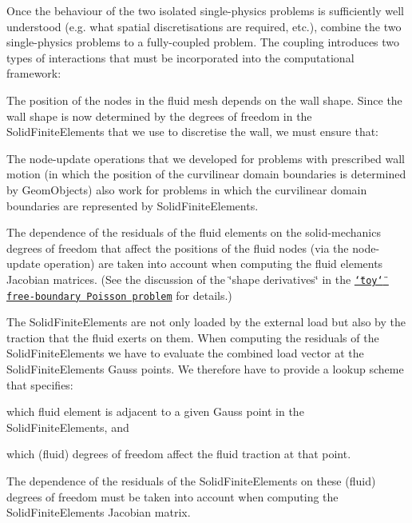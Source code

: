 Once the behaviour of the two isolated single-\/physics problems is sufficiently well understood (e.\+g. what spatial discretisations are required, etc.), combine the two single-\/physics problems to a fully-\/coupled problem. The coupling introduces two types of interactions that must be incorporated into the computational framework\+:
\begin{DoxyEnumerate}
\item The position of the nodes in the fluid mesh depends on the wall shape. Since the wall shape is now determined by the degrees of freedom in the {\ttfamily Solid\+Finite\+Elements} that we use to discretise the wall, we must ensure that\+:
\begin{DoxyEnumerate}
\item The node-\/update operations that we developed for problems with prescribed wall motion (in which the position of the curvilinear domain boundaries is determined by {\ttfamily Geom\+Objects}) also work for problems in which the curvilinear domain boundaries are represented by {\ttfamily Solid\+Finite\+Elements}.
\item The dependence of the residuals of the fluid elements on the solid-\/mechanics degrees of freedom that affect the positions of the fluid nodes (via the node-\/update operation) are taken into account when computing the fluid elements\textquotesingle{} Jacobian matrices. (See the discussion of the \char`\"{}shape derivatives\char`\"{} in the \href{../../macro_element_free_boundary_poisson/html/index.html}{\tt \char`\"{}toy\char`\"{} free-\/boundary Poisson problem} for details.)
\end{DoxyEnumerate}
\item The {\ttfamily Solid\+Finite\+Elements} are not only loaded by the external load but also by the traction that the fluid exerts on them. When computing the residuals of the {\ttfamily Solid\+Finite\+Elements} we have to evaluate the combined load vector at the {\ttfamily Solid\+Finite\+Element\textquotesingle{}s} Gauss points. We therefore have to provide a lookup scheme that specifies\+:
\begin{DoxyEnumerate}
\item which fluid element is adjacent to a given Gauss point in the {\ttfamily Solid\+Finite\+Elements}, and
\item which (fluid) degrees of freedom affect the fluid traction at that point.
\end{DoxyEnumerate}The dependence of the residuals of the {\ttfamily Solid\+Finite\+Elements} on these (fluid) degrees of freedom must be taken into account when computing the {\ttfamily Solid\+Finite\+Element\textquotesingle{}s} Jacobian matrix.
\end{DoxyEnumerate}

